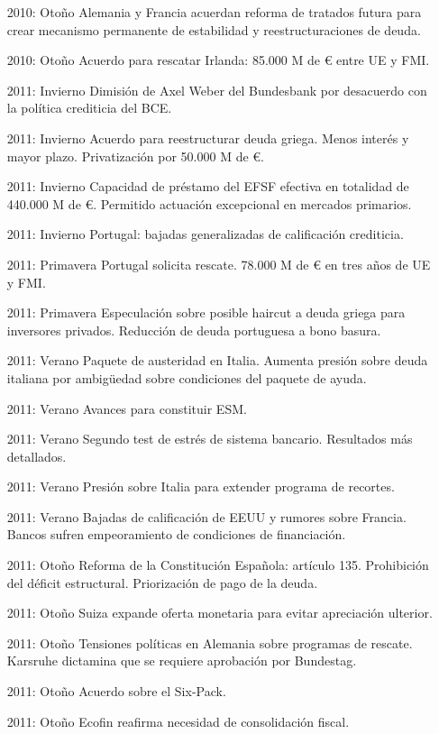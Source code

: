 \documentclass{nuevotema}
\begin{document}
\begin{itemize}
	\item[2010: Otoño] Alemania y Francia acuerdan reforma de tratados futura para crear mecanismo permanente de estabilidad y reestructuraciones de deuda. 
	\item[2010: Otoño] Acuerdo para rescatar Irlanda: 85.000 M de € entre UE y FMI. 
	\item[2011: Invierno] Dimisión de Axel Weber del Bundesbank por desacuerdo con la política crediticia del BCE.
	\item[2011: Invierno] Acuerdo para reestructurar deuda griega. Menos interés y mayor plazo. Privatización por 50.000 M de €. 
	\item[2011: Invierno] Capacidad de préstamo del EFSF efectiva en totalidad de 440.000 M de €. Permitido actuación excepcional en mercados primarios.
	\item[2011: Invierno] Portugal: bajadas generalizadas de calificación crediticia.
	\item[2011: Primavera] Portugal solicita rescate. 78.000 M de € en tres años de UE y FMI.
	\item[2011: Primavera] Especulación sobre posible haircut a deuda griega para inversores privados. Reducción de deuda portuguesa a bono basura.
	\item[2011: Verano] Paquete de austeridad en Italia. Aumenta presión sobre deuda italiana por ambigüedad sobre condiciones del paquete de ayuda.
	\item[2011: Verano] Avances para constituir ESM. 
	\item[2011: Verano] Segundo test de estrés de sistema bancario. Resultados más detallados.
	\item[2011: Verano] Presión sobre Italia para extender programa de recortes.
	\item[2011: Verano] Bajadas de calificación de EEUU y rumores sobre Francia. Bancos sufren empeoramiento de condiciones de financiación.
	\item[2011: Otoño] Reforma de la Constitución Española: artículo 135. Prohibición del déficit estructural. Priorización de pago de la deuda.
	\item[2011: Otoño] Suiza expande oferta monetaria para evitar apreciación ulterior.
	\item[2011: Otoño] Tensiones políticas en Alemania sobre programas de rescate. Karsruhe dictamina que se requiere aprobación por Bundestag.
	\item[2011: Otoño] Acuerdo sobre el Six-Pack.
	\item[2011: Otoño] Ecofin reafirma necesidad de consolidación fiscal.

\end{itemize}
\end{document}
